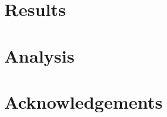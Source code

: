 \documentclass[11pt]{article}
\begin{document}
\section{Results}





\section{Analysis}

\section*{Acknowledgements}



\end{document}
